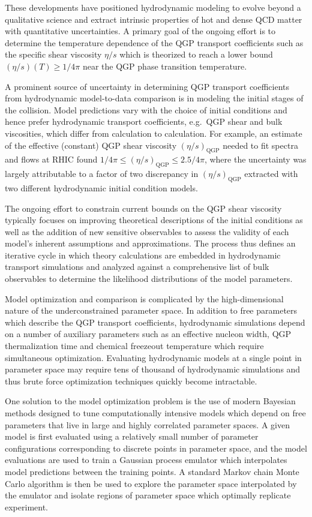 \documentclass[aps,prc,reprint,amsmath,nofootinbib]{revtex4-1}
\begin{document}
These developments have positioned hydrodynamic modeling to evolve beyond a qualitative science and extract intrinsic properties of hot and dense QCD matter with quantitative uncertainties. A primary goal of the ongoing effort is to determine the temperature dependence of the QGP transport coefficients such as the specific shear viscosity $\eta/s$ which is theorized to reach a lower bound ${(\eta/s)(T) \ge 1/4\pi}$ near the QGP phase transition temperature. 

A prominent source of uncertainty in determining QGP transport coefficients from hydrodynamic model-to-data comparison is in modeling the initial stages of the collision.
Model predictions vary with the choice of initial conditions and hence prefer hydrodynamic transport coefficients, e.g.\ QGP shear and bulk viscosities, which differ from calculation to calculation.
For example, an estimate of the effective (constant) QGP shear viscosity $(\eta/s)_\text{QGP}$ needed to fit spectra and flows at RHIC found ${1/4\pi \le (\eta/s)_\text{QGP} \le 2.5/4\pi}$, where the uncertainty was largely attributable to a factor of two discrepancy in $(\eta/s)_\text{QGP}$ extracted with two different hydrodynamic initial condition models. 

The ongoing effort to constrain current bounds on the QGP shear viscosity typically focuses on improving theoretical descriptions of the initial conditions as well as the addition of new sensitive observables to assess the validity of each model's inherent assumptions and approximations.
The process thus defines an iterative cycle in which theory calculations are embedded in hydrodynamic transport simulations and analyzed against a comprehensive list of bulk observables to determine the likelihood distributions of the model parameters.

Model optimization and comparison is complicated by the high-dimensional nature of the underconstrained parameter space.
In addition to free parameters which describe the QGP transport coefficients, hydrodynamic simulations depend on a number of auxiliary parameters such as an effective nucleon width, QGP thermalization time and chemical freezeout temperature which require simultaneous optimization.
Evaluating hydrodynamic models at a single point in parameter space may require tens of thousand of hydrodynamic simulations and thus brute force optimization techniques quickly become intractable. 

One solution to the model optimization problem is the use of modern Bayesian methods designed to tune computationally intensive models which depend on free parameters that live in large and highly correlated parameter spaces.
A given model is first evaluated using a relatively small number of parameter configurations corresponding to discrete points in parameter space, and the model evaluations are used to train a Gaussian process emulator which interpolates model predictions between the training points.
A standard Markov chain Monte Carlo algorithm is then be used to explore the parameter space interpolated by the emulator and isolate regions of parameter space which optimally replicate experiment. 
\end{document}

